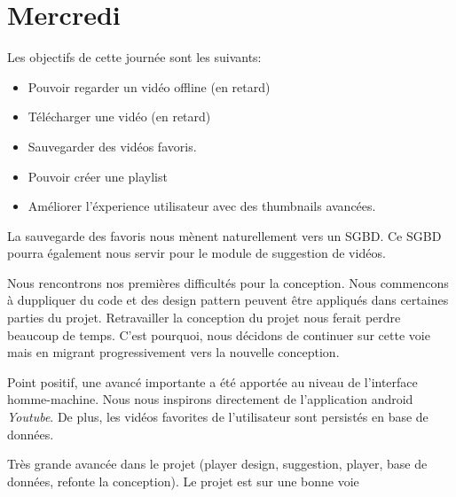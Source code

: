 \chapter{Mercredi}


Les objectifs de cette journée sont les suivants:

\begin{itemize}
	\item Pouvoir regarder un vidéo offline (en retard)
	\item Télécharger une vidéo (en retard)
	\item Sauvegarder des vidéos favoris.
	\item Pouvoir créer une playlist
	\item Améliorer l'éxperience utilisateur avec des thumbnails avancées.
\end{itemize}

La sauvegarde des favoris nous mènent naturellement vers un SGBD. Ce SGBD pourra également nous servir pour le module de suggestion de vidéos.

Nous rencontrons nos premières difficultés pour la conception. Nous commencons à duppliquer du code et des design pattern peuvent être appliqués dans certaines parties du projet. Retravailler la conception du projet nous ferait perdre beaucoup de temps. C'est pourquoi, nous décidons de continuer sur cette voie mais en migrant progressivement vers la nouvelle conception.

Point positif, une avancé importante a été apportée au niveau de l'interface homme-machine. Nous nous inspirons directement de l'application android \textit{Youtube}. De plus, les vidéos favorites de l'utilisateur sont persistés en base de données.


Très grande avancée dans le projet (player design, suggestion, player, base de données, refonte la conception). Le projet est sur une bonne voie